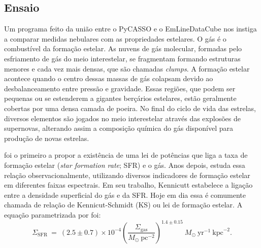 \subsection{Ensaio}
\label{apendice:EmLinesDataCube:EMLDC:ensaio}
Um programa feito da união entre o PyCASSO e o EmLineDataCube nos instiga a comparar medidas nebulares com as propriedades estelares. O gás é o combustível da formação estelar. As nuvens de gás molecular, formadas pelo esfriamento de gás do meio interestelar, se fragmentam formando estruturas menores e cada vez mais densas, que são chamadas {\em clumps}. A formação estelar acontece quando o centro dessas massas de gás colapsam devido ao desbalanceamento entre pressão e gravidade. Essas regiões, que podem ser pequenas ou se estenderem a gigantes berçários estelares, estão geralmente cobertas por uma densa camada de poeira. No
final do ciclo de vida das estrelas, diversos elementos são jogados no meio interestelar através das explosões de supernovas, alterando assim a composição química do gás disponível para produção de novas estrelas.

\citet{Schmidt.1959a} foi o primeiro a propor a existência de uma lei de potências que liga a taxa de formação estelar ({\em star formation rate}; SFR) e o gás. Anos depois, \citet{Kennicutt.1998a} estuda essa relação observacionalmente, utilizando diversos indicadores de formação estelar em diferentes faixas espectrais. Em seu trabalho, Kennicutt estabelece a ligação entre a densidade superficial do gás e da SFR. Hoje em dia essa é comumente chamada de relação de Kennicut-Schmidt (KS) ou lei de formação estelar. A
equação parametrizada por \citeauthor{Kennicutt.1998a} foi:
\begin{equation}
	\Sigma_{\mathrm{SFR}}\ =\ (2.5\pm0.7)\times 10^{-4} \left(\frac{\Sigma_{\mathrm{gas}}}{
M_\odot\ \mathrm{pc}^{-2}}\right)^{1.4 \pm 0.15}\ M_\odot\ \mathrm{yr}^{-1}\ \mathrm{kpc}^{-2}.
	\label{eq:SFRKennicutt}
\end{equation}

